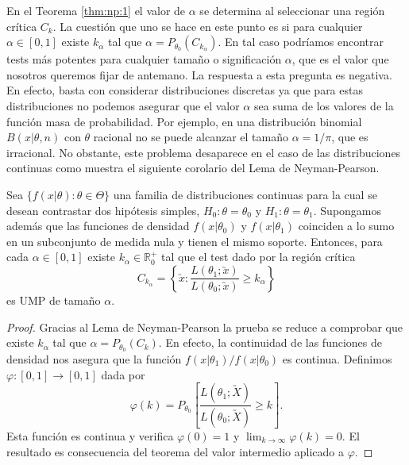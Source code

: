         En el Teorema \ref{thm:np:1} el valor de $\alpha$ se determina al seleccionar una región crítica $C_k$. La cuestión que uno se hace en este punto es si para cualquier $\alpha \in [0,1]$ existe $k_\alpha$ tal que  $\alpha = P_{\theta_0}(C_{k_\alpha})$. En tal caso podríamos encontrar tests más potentes para cualquier tamaño o significación $\alpha$, que es el valor que nosotros queremos fijar de antemano. La respuesta a esta pregunta es negativa. En efecto, basta con considerar distribuciones discretas ya que para estas distribuciones no podemos asegurar que el valor $\alpha$ sea suma de los valores de la función masa de probabilidad. Por ejemplo, en una distribución binomial $B(x|\theta,n)$ con $\theta$ racional no se puede alcanzar el tamaño $\alpha = 1 / \pi$, que es irracional. No obstante, este problema desaparece en el caso de las distribuciones continuas como muestra el siguiente corolario del Lema de Neyman-Pearson.

        \begin{cor} \label{cor:np:cont}
            Sea $\{f(x|\theta): \theta \in \Theta\}$ una familia de distribuciones continuas para la cual se desean contrastar dos hipótesis simples, $H_0 : \theta = \theta_0$ y $H_1 : \theta = \theta_1$. Supongamos además que las funciones de densidad $f(x|\theta_0)$ y $f(x|\theta_1)$ coinciden a lo sumo en un subconjunto de medida nula y tienen el mismo soporte. Entonces, para cada $\alpha \in [0,1]$ existe $k_\alpha \in \mathbb{R}^+_0$ tal que el test dado por la región crítica
            \[C_{k_\alpha} = \left\{\utilde{x}: \frac{L(\theta_1;\utilde{x})}{L(\theta_0;\utilde{x})} \ge k_\alpha\right\}\]
            es UMP de tamaño $\alpha$.
        \end{cor}
        \begin{proof}
            Gracias al Lema de Neyman-Pearson la prueba se reduce a comprobar que existe $k_\alpha$ tal que $\alpha = P_{\theta_0}(C_k)$. En efecto, la continuidad de las funciones de densidad nos asegura que la función $f(x| \theta_1) / f(x| \theta_0)$ es continua. Definimos $\varphi: [0,1] \to [0,1]$ dada por
            \[\varphi(k) = P_{\theta_0}\left[\frac{L(\theta_1;\utilde{X})}{L(\theta_0;\utilde{X})} \ge k\right].\]
            Esta función es continua y verifica $\varphi(0) = 1$ y $\lim_{k \to \infty} \varphi(k) = 0$. El resultado es consecuencia del teorema del valor intermedio aplicado a $\varphi$.
        \end{proof}

